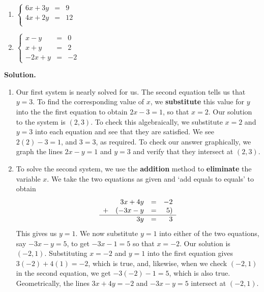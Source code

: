 \documentclass{ximera}
\begin{document}
\begin{example}
\begin{multicols}{3}
\begin{enumerate}
\item  $\left\{ \begin{array}{rcr} 6x + 3y & = & 9 \\ 4x + 2y & = & 12 \\ \end{array} \right.$ 

\item  $\left\{ \begin{array}{rcr} x - y & = & 0 \\ x + y & = & 2 \\ -2x + y & = & -2 \end{array} \right.$

\end{enumerate}
\end{multicols}

{\bf Solution.}

\begin{enumerate}

\item  Our first system is nearly solved for us.  The second equation tells us that $y=3$.  To find the corresponding value of $x$, we \textbf{substitute} this value for $y$ into the the first equation to obtain $2x -  3 = 1$, so that $x = 2$.  Our solution to the system is $(2,3)$.  To check this algebraically, we substitute $x=2$ and $y=3$ into each equation and see that they are satisfied.  We see $2(2) - 3 = 1$, and $3=3$, as required.  To check our answer graphically, we graph the lines $2x-y = 1$ and $y=3$ and verify that they intersect at $(2,3)$.

\setlength{\extrarowheight}{2pt}

\item  To solve the second system, we use the \textbf{addition} method to \textbf{eliminate} the variable $x$.  We take the two equations as given and `add equals to equals' to obtain \[ \begin{array}{lrcr} & 3x+4y & = & -2  \\ + & (-3x-y  & = & 5 ) \\ \hline & 3y & = & 3\end{array}\] This gives us $y = 1$.  We now substitute $y=1$ into either of the two equations, say $-3x-y = 5$, to get $-3x-1 = 5$ so that $x = -2$.  Our solution is $(-2,1)$.  Substituting $x=-2$ and $y=1$ into the first equation gives $3(-2) + 4(1) = -2$, which is true, and, likewise, when we check $(-2, 1)$ in the second equation, we get $-3(-2) - 1 = 5$, which is also true.  Geometrically, the lines $3x+4y = -2$ and $-3x-y=5$ intersect at $(-2,1)$.


\end{enumerate}
\end{example}
\end{document}

